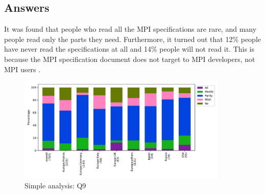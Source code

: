 
\subsection{Answers}


It was found that people who read all the MPI specifications are rare, 
and many people read only the parts they need. Furthermore, it turned 
out that 12\% people have never read the specifications at all and
14\% people will not read it. This is because the MPI specification
document does not target to MPI developers, not MPI users
.

\begin{figure}[htb]
\begin{center}
\includegraphics[width=10cm]{../pdfs/Q9.pdf}
\caption{Simple analysis: Q9}
\label{fig:Q9}
\end{center}
\end{figure}
